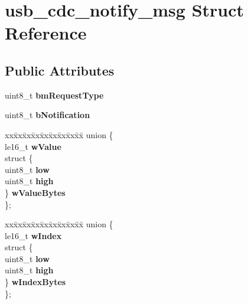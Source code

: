 \hypertarget{structusb__cdc__notify__msg}{}\section{usb\+\_\+cdc\+\_\+notify\+\_\+msg Struct Reference}
\label{structusb__cdc__notify__msg}
\subsection*{Public Attributes}
\begin{DoxyCompactItemize}
\item 
\mbox{\label{structusb__cdc__notify__msg_a601ccc8373a6dea319cf1bb845e21343}} 
uint8\+\_\+t {\bfseries bm\+Request\+Type}
\item 
\mbox{\label{structusb__cdc__notify__msg_ace9fd530fbac2d238a4bd4a177781de9}} 
uint8\+\_\+t {\bfseries b\+Notification}
\item 
\mbox{\label{structusb__cdc__notify__msg_ad1777e4f4a1c52780504ee93a7f58f66}} 
\begin{tabbing}
xx\=xx\=xx\=xx\=xx\=xx\=xx\=xx\=xx\=\kill
union \{\\
\>le16\_t {\bfseries wValue}\\
\>struct \{\\
\>\>uint8\_t {\bfseries low}\\
\>\>uint8\_t {\bfseries high}\\
\>\} {\bfseries wValueBytes}\\
\}; \\

\end{tabbing}\item 
\mbox{\label{structusb__cdc__notify__msg_a62ce47a20fb7cc7400ceda7377440c4a}} 
\begin{tabbing}
xx\=xx\=xx\=xx\=xx\=xx\=xx\=xx\=xx\=\kill
union \{\\
\>le16\_t {\bfseries wIndex}\\
\>struct \{\\
\>\>uint8\_t {\bfseries low}\\
\>\>uint8\_t {\bfseries high}\\
\>\} {\bfseries wIndexBytes}\\
\}; \\


\end{tabbing}
\end{DoxyCompactItemize}
